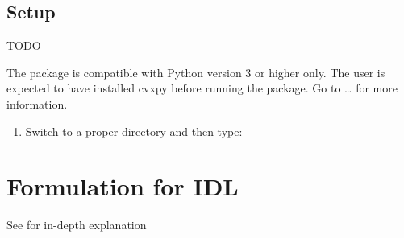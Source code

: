 \documentclass[letterpaper,10pt,english]{sphinxmanual}
\begin{document}
\section{Setup}
\label{\detokenize{sections/introduction:setup}}
TODO

The package is compatible with Python version 3 or higher only.
The user is expected to have installed cvxpy before running the package.
Go to … for more information.
\begin{enumerate}
%
\item {} 
Switch to a proper directory and then type:

\end{enumerate}

\begin{sphinxVerbatim}[commandchars=\\\{\}]
   
\end{sphinxVerbatim}


\chapter{Formulation for IDL}
\label{\detokenize{sections/bi_convex_formulation:formulation-for-idl}}\label{\detokenize{sections/bi_convex_formulation:formulation}}\label{\detokenize{sections/bi_convex_formulation::doc}}
See {\hyperref[\detokenize{sections/citing:citing}]{}} for in-depth explanation
\end{document}

